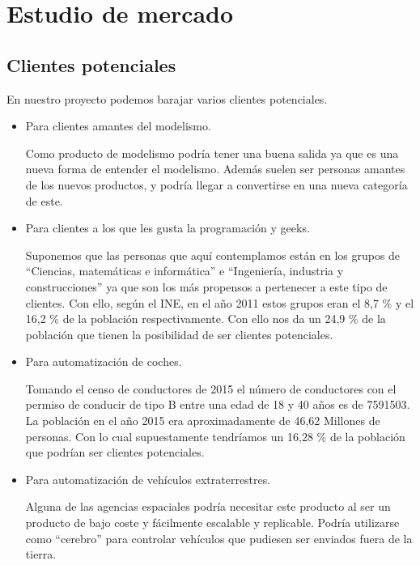 \documentclass{pclass}
\begin{document}
\section{Estudio de mercado}
\subsection{Clientes potenciales}

	En nuestro proyecto podemos barajar varios clientes potenciales.
	
	\begin{itemize}
		\item Para clientes amantes del modelismo.
		
			Como producto de modelismo podría tener una buena salida ya que es una nueva forma de entender el modelismo. Además suelen ser personas amantes de los nuevos productos, y podría llegar a convertirse en una nueva categoría de este.
			
			
		\item Para clientes a los que les gusta la programación y geeks.
			
			Suponemos que las personas que aquí contemplamos están en los grupos de ``Ciencias, matemáticas e informática'' e ``Ingeniería, industria y construcciones'' ya que son los más propensos a pertenecer a este tipo de clientes. Con ello, según el INE, en el año 2011 estos grupos eran el 8,7 \% y el 16,2 \% de la población respectivamente. Con ello nos da un 24,9 \% de la población que tienen la posibilidad de ser clientes potenciales. \cite{censoINE}
		
		\item Para automatización de coches.
		
			Tomando el censo de conductores de 2015 el número de conductores con el permiso de conducir de tipo B entre una edad de 18 y 40 años es de 7591503. La población en el año 2015 era aproximadamente de 46,62 Millones de personas. Con lo cual supuestamente tendríamos un 16,28 \% de la población que podrían ser clientes potenciales. \cite{censoDGT}
			
		
		\item Para automatización de vehículos extraterrestres.
		
			Alguna de las agencias espaciales podría necesitar este producto al ser un producto de bajo coste y fácilmente escalable y replicable. Podría utilizarse como ``cerebro'' para controlar vehículos que pudiesen ser enviados fuera de la tierra.
			
		
	\end{itemize}
\end{document}
